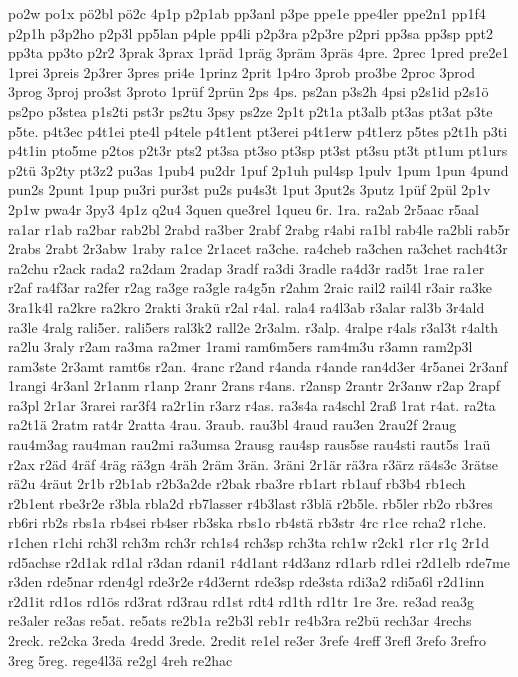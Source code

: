 {po2w
po1x
pö2bl
pö2c
4p1p
p2p1ab
pp3anl
p3pe
ppe1e
ppe4ler
ppe2n1
pp1f4
p2p1h
p3p2ho
p2p3l
pp5lan
p4ple
pp4li
p2p3ra
p2p3re
p2pri
pp3sa
pp3sp
ppt2
pp3ta
pp3to
p2r2
3prak
3prax
1präd
1präg
3präm
3präs
4pre.
2prec
1pred
pre2e1
1prei
3preis
2p3rer
3pres
pri4e
1prinz
2prit
1p4ro
3prob
pro3be
2proc
3prod
3prog
3proj
pro3st
3proto
1prüf
2prün
2ps
4ps.
ps2an
p3s2h
4psi
p2s1id
p2s1ö
ps2po
p3stea
p1s2ti
pst3r
ps2tu
3psy
ps2ze
2p1t
p2t1a
pt3alb
pt3as
pt3at
p3te
p5te.
p4t3ec
p4t1ei
pte4l
p4tele
p4t1ent
pt3erei
p4t1erw
p4t1erz
p5tes
p2t1h
p3ti
p4t1in
pto5me
p2tos
p2t3r
pts2
pt3sa
pt3so
pt3sp
pt3st
pt3su
pt3t
pt1um
pt1urs
p2tü
3p2ty
pt3z2
pu3as
1pub4
pu2dr
1puf
2p1uh
pul4sp
1pulv
1pum
1pun
4pund
pun2s
2punt
1pup
pu3ri
pur3st
pu2s
pu4s3t
1put
3put2s
3putz
1püf
2pül
2p1v
2p1w
pwa4r
3py3
4p1z
q2u4
3quen
que3rel
1queu
6r.
1ra.
ra2ab
2r5aac
r5aal
ra1ar
r1ab
ra2bar
rab2bl
2rabd
ra3ber
2rabf
2rabg
r4abi
ra1bl
rab4le
ra2bli
rab5r
2rabs
2rabt
2r3abw
1raby
ra1ce
2r1acet
ra3che.
ra4cheb
ra3chen
ra3chet
rach4t3r
ra2chu
r2ack
rada2
ra2dam
2radap
3radf
ra3di
3radle
ra4d3r
rad5t
1rae
ra1er
r2af
ra4f3ar
ra2fer
r2ag
ra3ge
ra3gle
ra4g5n
r2ahm
2raic
rail2
rail4l
r3air
ra3ke
3ra1k4l
ra2kre
ra2kro
2rakti
3rakü
r2al
r4al.
rala4
ra4l3ab
r3alar
ral3b
3r4ald
ra3le
4ralg
rali5er.
rali5ers
ral3k2
rall2e
2r3alm.
r3alp.
4ralpe
r4als
r3al3t
r4alth
ra2lu
3raly
r2am
ra3ma
ra2mer
1rami
ram6m5ers
ram4m3u
r3amn
ram2p3l
ram3ste
2r3amt
ramt6s
r2an.
4ranc
r2and
r4anda
r4ande
ran4d3er
4r5anei
2r3anf
1rangi
4r3anl
2r1anm
r1anp
2ranr
2rans
r4ans.
r2ansp
2rantr
2r3anw
r2ap
2rapf
ra3pl
2r1ar
3rarei
rar3f4
ra2r1in
r3arz
r4as.
ra3s4a
ra4schl
2raß
1rat
r4at.
ra2ta
ra2t1ä
2ratm
rat4r
2ratta
4rau.
3raub.
rau3bl
4raud
rau3en
2rau2f
2raug
rau4m3ag
rau4man
rau2mi
ra3umsa
2rausg
rau4sp
raus5se
rau4sti
raut5s
1raü
r2ax
r2äd
4räf
4räg
rä3gn
4räh
2räm
3rän.
3räni
2r1är
rä3ra
r3ärz
rä4s3c
3rätse
rä2u
4räut
2r1b
r2b1ab
r2b3a2de
r2bak
rba3re
rb1art
rb1auf
rb3b4
rb1ech
r2b1ent
rbe3r2e
r3bla
rbla2d
rb7lasser
r4b3last
r3blä
r2b5le.
rb5ler
rb2o
rb3res
rb6ri
rb2s
rbs1a
rb4sei
rb4ser
rb3ska
rbs1o
rb4stä
rb3str
4rc
r1ce
rcha2
r1che.
r1chen
r1chi
rch3l
rch3m
rch3r
rch1s4
rch3sp
rch3ta
rch1w
r2ck1
r1cr
r1ç
2r1d
rd5achse
r2d1ak
rd1al
r3dan
rdani1
r4d1ant
r4d3anz
rd1arb
rd1ei
r2d1elb
rde7me
r3den
rde5nar
rden4gl
rde3r2e
r4d3ernt
rde3sp
rde3sta
rdi3a2
rdi5a6l
r2d1inn
r2d1it
rd1os
rd1ös
rd3rat
rd3rau
rd1st
rdt4
rd1th
rd1tr
1re
3re.
re3ad
rea3g
re3aler
re3as
re5at.
re5ats
re2b1a
re2b3l
reb1r
re4b3ra
re2bü
rech3ar
4rechs
2reck.
re2cka
3reda
4redd
3rede.
2redit
re1el
re3er
3refe
4reff
3refl
3refo
3refro
3reg
5reg.
rege4l3ä
re2gl
4reh
re2hac
}

